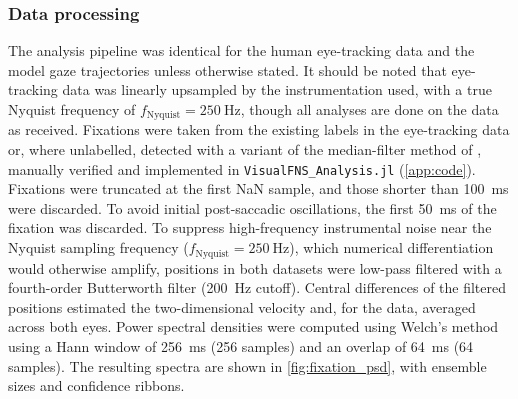\subsubsection*{Data processing}
The analysis pipeline was identical for the human eye-tracking data and the model gaze trajectories unless otherwise stated. It should be noted that eye-tracking data was linearly upsampled by the instrumentation used, with a true Nyquist frequency of $f_{\text{Nyquist}}=\qty{250}{\hertz}$, though all analyses are done on the data as received. Fixations were taken from the existing labels in the eye-tracking data or, where unlabelled, detected with a variant of the median-filter method of \cite{Schweitzer2020-nu, ENGBERT20031035}, manually verified and implemented in \texttt{VisualFNS\_Analysis.jl} (\cref{app:code}). Fixations were truncated at the first NaN sample, and those shorter than \qty{100}{\milli\second} were discarded. To avoid initial post-saccadic oscillations, the first \qty{50}{\milli \second} of the fixation was discarded. To suppress high-frequency instrumental noise near the Nyquist sampling frequency ($f_{\text{Nyquist}}=\qty{250}{\hertz}$), which numerical differentiation would otherwise amplify, positions in both datasets were low-pass filtered with a fourth-order Butterworth filter (\qty{200}{\hertz} cutoff). Central differences of the filtered positions estimated the two-dimensional velocity and, for the data, averaged across both eyes. Power spectral densities were computed using Welch's method using a Hann window of \qty{256}{\milli\second} (256 samples) and an overlap of \qty{64}{\milli\second} (64 samples). The resulting spectra are shown in \cref{fig:fixation_psd}, with ensemble sizes and confidence ribbons.

